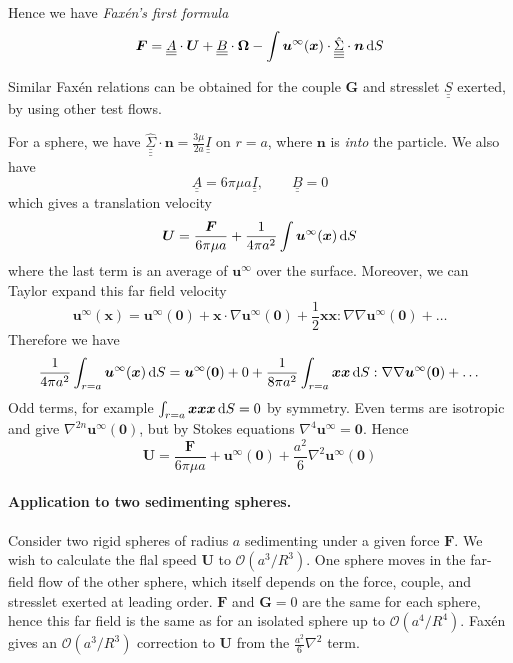 \documentclass{jknotes}
\newcommand{\dunder}[1]{\underline{\underline{#1}}}
\newcommand{\x}{\bm{x}}
\renewcommand{\u}{\bm{u}}
\begin{document}
Hence we have \emph{Fax\'{e}n's first formula}
\begin{equation}
	\bm{F} = \dunder{A}\cdot\bm{U} + \dunder{B} \cdot \bm{\Omega} - \int
	\bm{u}^\infty(\x) \cdot
	\hat{\dunder{\underline{\Sigma}}}\cdot\bm{n}\,\diffd S
\end{equation}

Similar Fax\'{e}n relations can be obtained for the couple $\bm{G}$ and
stresslet $\dunder{S}$ exerted, by using other test flows.

\begin{eg}
	For a sphere, we have $\hat{\dunder{\underline{\Sigma}}}\cdot\bm{n} =
	\frac{3\mu}{2a} \dunder{I}$ on $r=a$, where $\bm{n}$ is \emph{into} the
	particle. We also have
	\begin{equation}
		\dunder{A} = 6\pi \mu a \dunder{I}, \hspace{2em} \dunder{B} = 0
	\end{equation}
	which gives a translation velocity
	\begin{equation}
		\bm{U} = \frac{\bm{F}}{6\pi\mu a} + \frac{1}{4\pi a^2} \int
		\u^\infty(\x) \, \diffd S
	\end{equation}
	where the last term is an average of $\u^\infty$ over the surface.
	Moreover, we can Taylor expand this far field velocity
	\begin{equation}
		\u^\infty(\x) = \u^\infty(\bm{0}) + \x \cdot \nabla \u^\infty(\bm{0})
		+ \frac{1}{2}\x\x:\nabla\nabla \u^\infty(\bm{0}) + \dots
	\end{equation}
	Therefore we have
	\begin{equation}
		\frac{1}{4\pi a^2} \int_{r=a} \u^\infty(\x) \, \diffd S =
		\u^\infty(\bm{0}) + 0 + \frac{1}{8\pi a^2} \int_{r=a} \x \x \, \diffd
		S : \nabla \nabla \u^\infty(\bm{0}) + \dots
	\end{equation}
	Odd terms, for example $\int_{r=a} \x\x\x\,\diffd S = 0$ by symmetry. Even
	terms are isotropic and give $\nabla^{2n} \u^\infty(\bm{0})$, but by
	Stokes equations $\nabla^4 \u^\infty = \bm{0}$. Hence
	\begin{equation}
		\bm{U} = \frac{\bm{F}}{6\pi\mu a} + \u^\infty(\bm{0}) + \frac{a^2}{6}
		\nabla^2 \u^\infty(\bm{0})
	\end{equation}
\end{eg}

\paragraph{Application to two sedimenting spheres.}
Consider two rigid spheres of radius $a$ sedimenting under a given force
$\bm{F}$. We wish to calculate the flal speed $\bm{U}$ to
$\mathcal{O}(a^3/R^3)$. One sphere moves in the far-field flow of the other
sphere, which itself depends on the force, couple, and stresslet exerted at
leading order. $\bm{F}$ and $\bm{G} = 0$ are the same for each sphere, hence
this far field is the same as for an isolated sphere up to
$\mathcal{O}(a^4/R^4)$. Fax\'{e}n gives an $\mathcal{O}(a^3/R^3)$ correction
to $\bm{U}$ from the $\frac{a^2}{6}\nabla^2$ term.
\end{document}
